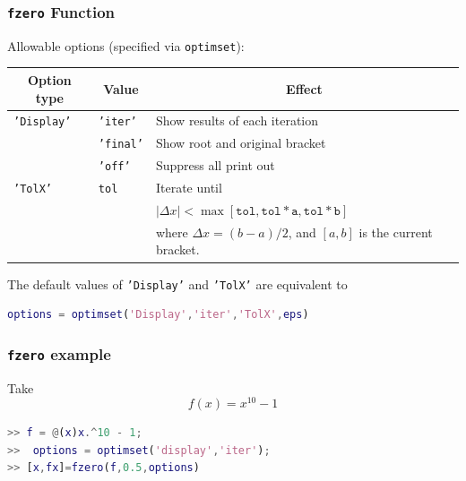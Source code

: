 \documentclass[10pt]{beamer}
\begin{document}
\begin{frame}[fragile]
\frametitle{\texttt{fzero} Function}

Allowable options (specified via \texttt{optimset}):
\begin{center}
    \renewcommand{\arraystretch}{1.3}
    \small
    \begin{tabular}{llp{12cm}}
        \multicolumn{1}{c}{Option type}
        & \multicolumn{1}{c}{Value}
        & \multicolumn{1}{c}{Effect}  \\
        \hline
        \texttt{'Display'} & \texttt{'iter'}  & Show results of each iteration \\
                           & \texttt{'final'} & Show root and original bracket \\
                           & \texttt{'off'}   & Suppress all print out \\[16pt]
        \texttt{'TolX'}    & \texttt{tol}     & Iterate until\\
                           &                  & \qquad$\displaystyle\left|\Delta x\right|<\max\left[\mathtt{tol},\mathtt{tol}*\mathtt{a}, \mathtt{tol}*\mathtt{b}\right]$\\
                           &                  & where $\Delta x = (b-a)/2$, and $[a,b]$ is the current bracket. \\
         \hline
    \end{tabular}
\end{center}

\vspace{2ex}
The default values of \texttt{'Display'} and \texttt{'TolX'}
are equivalent to
\begin{lstlisting}[language=matlab]
options = optimset('Display','iter','TolX',eps)
\end{lstlisting}

\end{frame}
\begin{frame}[fragile]
\frametitle{\texttt{fzero} example}
Take
\begin{equation*}
  f(x) = x^{10} - 1
\end{equation*}

\vspace{1cm}
\begin{lstlisting}[language=matlab]
>> f = @(x)x.^10 - 1;
>>  options = optimset('display','iter');
>> [x,fx]=fzero(f,0.5,options)
\end{lstlisting}
\end{frame}
\end{document}
